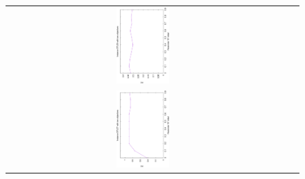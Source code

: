 \begin{figure}[h]
\begin{tabular}{ccc}
   \includegraphics[width=0.2\textwidth,angle=-90,origin=c]{Figures_Chapter7/Results_Chapter3/EPS_DI/2obj_DTLZ6.eps}
   \\
  \includegraphics[width=0.2\textwidth, angle=-90,origin=c]{Figures_Chapter7/Results_Chapter3/EPS_DI/2obj_DTLZ7.eps}
\end{tabular}
\end{figure}

